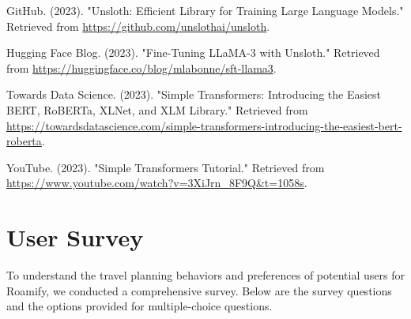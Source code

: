 \documentclass[conference]{IEEEtran}
\begin{document}
\begin{thebibliography}{1}
        GitHub. (2023). "Unsloth: Efficient Library for Training Large Language Models." Retrieved from \url{https://github.com/unslothai/unsloth}.

        Hugging Face Blog. (2023). "Fine-Tuning LLaMA-3 with Unsloth." Retrieved from \url{https://huggingface.co/blog/mlabonne/sft-llama3}.

        Towards Data Science. (2023). "Simple Transformers: Introducing the Easiest BERT, RoBERTa, XLNet, and XLM Library." Retrieved from \url{https://towardsdatascience.com/simple-transformers-introducing-the-easiest-bert-roberta}.

        YouTube. (2023). "Simple Transformers Tutorial." Retrieved from \url{https://www.youtube.com/watch?v=3XiJrn_8F9Q&t=1058s}.

\end{thebibliography}

\newpage

\appendix

\section{User Survey}
    To understand the travel planning behaviors and preferences of potential users for Roamify, we conducted a comprehensive survey. Below are the survey questions and the options provided for multiple-choice questions.
    \\
\end{document}
